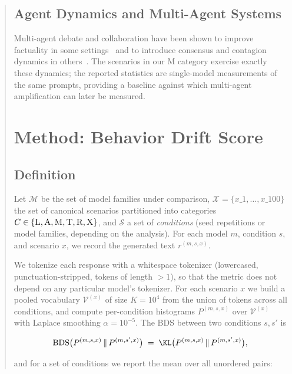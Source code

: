 \documentclass[11pt]{article}
\DeclareMathOperator{\BDS}{BDS}
\begin{document}
\begin{abstract}
\subsection{Agent Dynamics and Multi-Agent Systems}

Multi-agent debate and collaboration have been shown to improve factuality
in some settings~\citep{du2024improving,li2023camel,liang2023multiagent}
and to introduce consensus and contagion dynamics in
others~\citep{park2023generative,liu2026memorycontagion}. The scenarios in
our \textsc{M} category exercise exactly these dynamics; the reported
statistics are single-model measurements of the same prompts, providing a
baseline against which multi-agent amplification can later be measured.

\section{Method: Behavior Drift Score}
\label{sec:method}

\subsection{Definition}

Let $\mathcal{M}$ be the set of model families under comparison, $\mathcal{X}
= \{x\_1, \ldots, x\_{100}\}$ the set of canonical scenarios partitioned into
categories $C \in \{\textsc{L}, \textsc{A}, \textsc{M}, \textsc{T},
\textsc{R}, \textsc{X}\}$, and $\mathcal{S}$ a set of \emph{conditions}
(seed repetitions or model families, depending on the analysis). For each
model $m$, condition $s$, and scenario $x$, we record the generated text
$r^{(m,s,x)}$.

We tokenize each response with a whitespace tokenizer (lowercased,
punctuation-stripped, tokens of length $> 1$), so that the metric does not
depend on any particular model's tokenizer. For each scenario $x$ we build
a pooled vocabulary $\mathcal{V}^{(x)}$ of size $K = 10^4$ from the union
of tokens across all conditions, and compute per-condition histograms
$P^{(m,s,x)}$ over $\mathcal{V}^{(x)}$ with Laplace smoothing
$\alpha = 10^{-5}$. The BDS between two conditions $s, s'$ is

\begin{equation}
  \BDS\bigl(P^{(m,s,x)} \,\|\, P^{(m,s',x)}\bigr)
  \;=\; \KL\bigl(P^{(m,s,x)} \,\|\, P^{(m,s',x)}\bigr),
\end{equation}

and for a set of conditions we report the mean over all unordered pairs:


\end{abstract}
\end{document}
